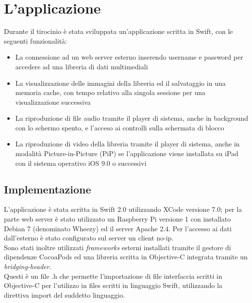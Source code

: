\chapter{L'applicazione}
Durante il tirocinio è stata sviluppata un'applicazione scritta in Swift, con le seguenti funzionalità:
\begin{itemize}
\item La connessione ad un web server esterno inserendo username e password per accedere ad una libreria di dati multimediali
\item La visualizzazione delle immagini della libreria ed il salvataggio in una memoria cache, con tempo relativo alla singola sessione per una visualizzazione successiva
\item La riproduzione di file audio tramite il player di sistema, anche in background con lo schermo spento, e l'acceso ai controlli sulla schermata di blocco
\item La riproduzione di video della libreria tramite il player di sistema, anche in modalità Picture-in-Picture (PiP) se l'applicazione viene installata su iPad con il sistema operativo iOS 9.0 o successivi
\end{itemize}
\section{Implementazione}
L'applicazione è stata scritta in Swift 2.0 utilizzando XCode versione 7.0; per la parte web server è stato utilizzato un Raspberry Pi versione 1 con installato Debian 7 (denominato Wheezy) ed il server Apache 2.4. Per l'accesso ai dati dall'esterno è stato configurato sul server un client no-ip.\\
Sono stati inoltre utilizzati \textit{frameworks} esterni installati tramite il gestore di dipendenze CocoaPods ed una libreria scritta in Objective-C integrata tramite un \textit{bridging-header}.\\
Questi è un file .h che permette l'importazione di file interfaccia scritti in Objective-C per l'utilizzo in files scritti in linguaggio Swift, utilizzando la direttiva import del suddetto linguaggio.
